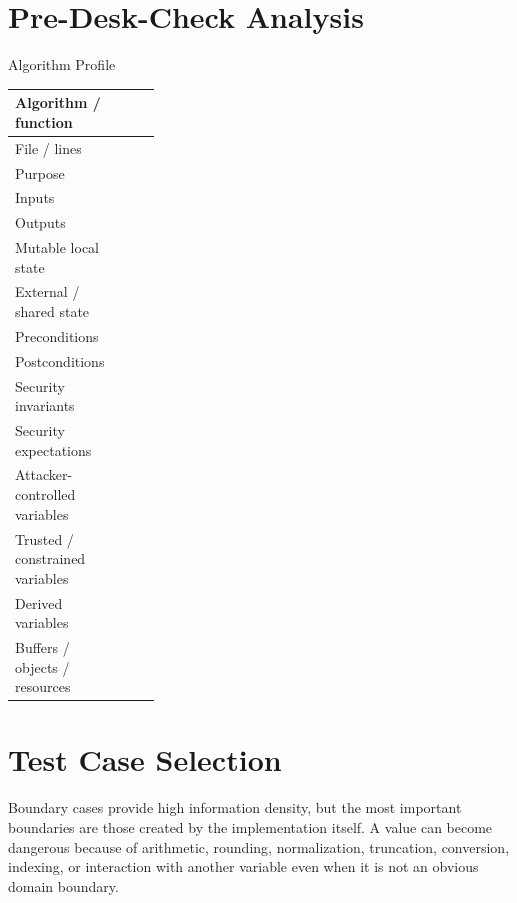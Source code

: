 \documentclass[10pt]{article}
\begin{document}
\section{Pre-Desk-Check Analysis}
\begin{worksheetbox}{Algorithm Profile}
\par\smallskip\noindent\begin{tabularx}{\linewidth}{@{}L{0.29\linewidth}Y@{}}
Algorithm / function & \\ \midrule
File / lines & \\ \midrule
Purpose & \\ \midrule
Inputs & \\ \midrule
Outputs & \\ \midrule
Mutable local state & \\ \midrule
External / shared state & \\ \midrule
Preconditions & \\ \midrule
Postconditions & \\ \midrule
Security invariants & \\ \midrule
Security expectations & \\ \midrule
Attacker-controlled variables & \\ \midrule
Trusted / constrained variables & \\ \midrule
Derived variables & \\ \midrule
Buffers / objects / resources & \\ 
\end{tabularx}
\end{worksheetbox}
\clearpage

\section{Test Case Selection}
Boundary cases provide high information density, but the most important boundaries are those created by the implementation itself. A value can become dangerous because of arithmetic, rounding, normalization, truncation, conversion, indexing, or interaction with another variable even when it is not an obvious domain boundary.
\end{document}
